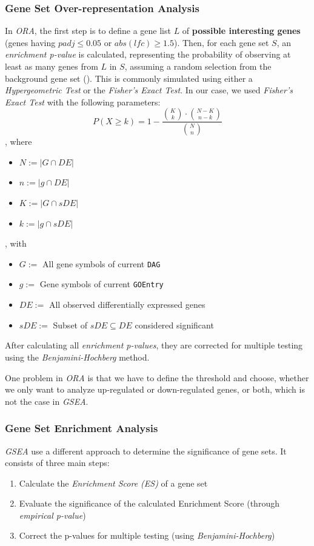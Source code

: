 \documentclass[12pt]{article}
\begin{document}
\subsubsection{Gene Set Over-representation Analysis}\label{sec:Gene-Set-Over-representation-Analysis}
In \textit{ORA}, the first step is to define a gene list $L$ of \textbf{possible interesting genes} (genes having $padj \le 0.05$ or $abs(lfc) \ge 1.5$).
Then, for each gene set $S$, an \textit{enrichment p-value} is calculated, representing the 
probability of observing at least as many genes from $L$ in $S$, assuming a random selection from the background gene set (\cite{ORA}).
This is commonly simulated using either a \textit{Hypergeometric Test} or the \textit{Fisher's Exact Test}.
In our case, we used \textit{Fisher's Exact Test} with the following parameters:
\[
    P(X \ge k) = 1 - \frac{\binom{K}{k} \cdot \binom{N-K}{n-k}}{\binom{N}{n}} 
\]
, where 
\begin{itemize}
    \item $N := |G \cap DE|$ 
    \item $n := |g \cap DE|$ 
    \item $K := |G \cap sDE|$ 
    \item $k := |g \cap sDE|$ 
\end{itemize}
, with 
\begin{itemize}
    \item $G := $ All gene symbols of current \texttt{DAG}
    \item $g := $ Gene symbols of current \texttt{GOEntry}
    \item $DE := $ All observed differentially expressed genes 
    \item $sDE :=$ Subset of $sDE \subseteq DE$ considered significant
\end{itemize}

After calculating all \textit{enrichment p-values}, they are corrected for multiple testing
using the \textit{Benjamini-Hochberg} method.

One problem in \textit{ORA} is that we have to define the threshold and choose, whether we only want to
analyze up-regulated or down-regulated genes, or both, which is not the case in \textit{GSEA}.

\subsubsection{Gene Set Enrichment Analysis}\label{sec:Gene-Set-Enrichment-Analysis}
\textit{GSEA} use a different approach to determine the significance of gene sets.
It consists of three main steps:
\begin{enumerate}
    \item Calculate the \textit{Enrichment Score (ES)} of a gene set
    \item Evaluate the significance of the calculated Enrichment Score (through \textit{empirical p-value})
    \item Correct the p-values for multiple testing (using \textit{Benjamini-Hochberg})
\end{enumerate}
\end{document}
